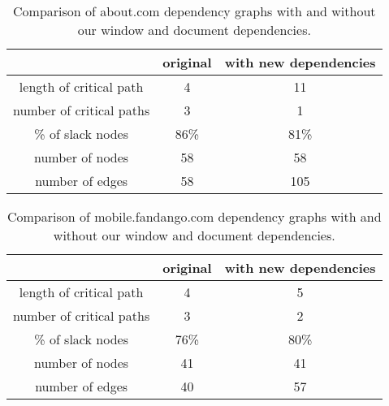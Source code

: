\begin{table*}[tb]
\centering
\small
\begin{tabular}{|c|c|c|}
\hline
 & original & with new dependencies \\
\hline
length of critical path & 4 & 11 \\
number of critical paths & 3 & 1 \\
\% of slack nodes & 86\% & 81\% \\
number of nodes & 58 & 58 \\
number of edges & 58 & 105 \\
\hline
\end{tabular}\caption{Comparison of about.com dependency graphs with and without our window and document dependencies.}
\label{t:aboutgraph}
\end{table*}


\begin{table*}[tb]
\centering
\small
\begin{tabular}{|c|c|c|}
\hline
 & original & with new dependencies \\
\hline
length of critical path & 4 & 5 \\
number of critical paths & 3 & 2 \\
\% of slack nodes & 76\% & 80\% \\
number of nodes & 41 & 41 \\
number of edges & 40 & 57 \\
\hline
\end{tabular}\caption{Comparison of mobile.fandango.com dependency graphs with and without our window and document dependencies.}
\label{t:fandangograph}
\end{table*}
